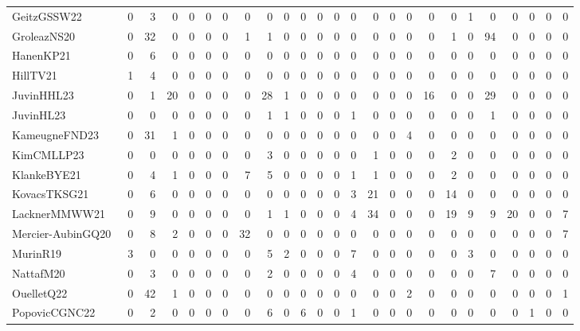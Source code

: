 \documentclass[a4paper]{article}
\begin{document}
\begin{longtable}{l*{24}{r}}
GeitzGSSW22~\cite{GeitzGSSW22} & 0 & 3 & 0 & 0 & 0 & 0 & 0 & 0 & 0 & 0 & 0 & 0 & 0 & 0 & 0 & 0 & 0 & 0 & 1 & 0 & 0 & 0 & 0 & 0\\
GroleazNS20~\cite{GroleazNS20} & 0 & 32 & 0 & 0 & 0 & 0 & 1 & 1 & 0 & 0 & 0 & 0 & 0 & 0 & 0 & 0 & 0 & 1 & 0 & 94 & 0 & 0 & 0 & 0\\
HanenKP21~\cite{HanenKP21} & 0 & 6 & 0 & 0 & 0 & 0 & 0 & 0 & 0 & 0 & 0 & 0 & 0 & 0 & 0 & 0 & 0 & 0 & 0 & 0 & 0 & 0 & 0 & 0\\
HillTV21~\cite{HillTV21} & 1 & 4 & 0 & 0 & 0 & 0 & 0 & 0 & 0 & 0 & 0 & 0 & 0 & 0 & 0 & 0 & 0 & 0 & 0 & 0 & 0 & 0 & 0 & 0\\
JuvinHHL23~\cite{JuvinHHL23} & 0 & 1 & 20 & 0 & 0 & 0 & 0 & 28 & 1 & 0 & 0 & 0 & 0 & 0 & 0 & 0 & 16 & 0 & 0 & 29 & 0 & 0 & 0 & 0\\
JuvinHL23~\cite{JuvinHL23} & 0 & 0 & 0 & 0 & 0 & 0 & 0 & 1 & 1 & 0 & 0 & 0 & 1 & 0 & 0 & 0 & 0 & 0 & 0 & 1 & 0 & 0 & 0 & 0\\
KameugneFND23~\cite{KameugneFND23} & 0 & 31 & 1 & 0 & 0 & 0 & 0 & 0 & 0 & 0 & 0 & 0 & 0 & 0 & 0 & 4 & 0 & 0 & 0 & 0 & 0 & 0 & 0 & 0\\
KimCMLLP23~\cite{KimCMLLP23} & 0 & 0 & 0 & 0 & 0 & 0 & 0 & 3 & 0 & 0 & 0 & 0 & 0 & 1 & 0 & 0 & 0 & 2 & 0 & 0 & 0 & 0 & 0 & 0\\
KlankeBYE21~\cite{KlankeBYE21} & 0 & 4 & 1 & 0 & 0 & 0 & 7 & 5 & 0 & 0 & 0 & 0 & 1 & 1 & 0 & 0 & 0 & 2 & 0 & 0 & 0 & 0 & 0 & 0\\
KovacsTKSG21~\cite{KovacsTKSG21} & 0 & 6 & 0 & 0 & 0 & 0 & 0 & 0 & 0 & 0 & 0 & 0 & 3 & 21 & 0 & 0 & 0 & 14 & 0 & 0 & 0 & 0 & 0 & 0\\
LacknerMMWW21~\cite{LacknerMMWW21} & 0 & 9 & 0 & 0 & 0 & 0 & 0 & 1 & 1 & 0 & 0 & 0 & 4 & 34 & 0 & 0 & 0 & 19 & 9 & 9 & 20 & 0 & 0 & 7\\
Mercier-AubinGQ20~\cite{Mercier-AubinGQ20} & 0 & 8 & 2 & 0 & 0 & 0 & 32 & 0 & 0 & 0 & 0 & 0 & 0 & 0 & 0 & 0 & 0 & 0 & 0 & 0 & 0 & 0 & 0 & 7\\
MurinR19~\cite{MurinR19} & 3 & 0 & 0 & 0 & 0 & 0 & 0 & 5 & 2 & 0 & 0 & 0 & 7 & 0 & 0 & 0 & 0 & 0 & 3 & 0 & 0 & 0 & 0 & 0\\
NattafM20~\cite{NattafM20} & 0 & 3 & 0 & 0 & 0 & 0 & 0 & 2 & 0 & 0 & 0 & 0 & 4 & 0 & 0 & 0 & 0 & 0 & 0 & 7 & 0 & 0 & 0 & 0\\
OuelletQ22~\cite{OuelletQ22} & 0 & 42 & 1 & 0 & 0 & 0 & 0 & 0 & 0 & 0 & 0 & 0 & 0 & 0 & 0 & 2 & 0 & 0 & 0 & 0 & 0 & 0 & 0 & 1\\
PopovicCGNC22~\cite{PopovicCGNC22} & 0 & 2 & 0 & 0 & 0 & 0 & 0 & 6 & 0 & 6 & 0 & 0 & 1 & 0 & 0 & 0 & 0 & 0 & 0 & 0 & 0 & 1 & 0 & 0\\

\end{longtable}
\end{document}

